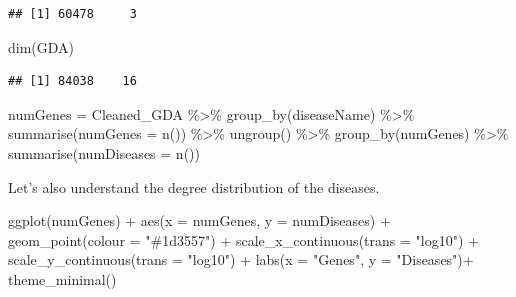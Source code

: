 \documentclass[
]{book}
\newenvironment{Shaded}{\begin{snugshade}}{\end{snugshade}}
\newcommand{\AttributeTok}[1]{\textcolor[rgb]{0.77,0.63,0.00}{#1}}
\newcommand{\FunctionTok}[1]{\textcolor[rgb]{0.00,0.00,0.00}{#1}}
\newcommand{\NormalTok}[1]{#1}
\newcommand{\OtherTok}[1]{\textcolor[rgb]{0.56,0.35,0.01}{#1}}
\newcommand{\SpecialCharTok}[1]{\textcolor[rgb]{0.00,0.00,0.00}{#1}}
\newcommand{\StringTok}[1]{\textcolor[rgb]{0.31,0.60,0.02}{#1}}
\begin{document}
\begin{verbatim}
## [1] 60478     3
\end{verbatim}

\begin{Shaded}
\begin{Highlighting}[]
\FunctionTok{dim}\NormalTok{(GDA)}
\end{Highlighting}
\end{Shaded}

\begin{verbatim}
## [1] 84038    16
\end{verbatim}

\begin{Shaded}
\begin{Highlighting}[]
\NormalTok{numGenes }\OtherTok{=}\NormalTok{ Cleaned\_GDA }\SpecialCharTok{\%\textgreater{}\%} 
  \FunctionTok{group\_by}\NormalTok{(diseaseName) }\SpecialCharTok{\%\textgreater{}\%}
  \FunctionTok{summarise}\NormalTok{(}\AttributeTok{numGenes =} \FunctionTok{n}\NormalTok{()) }\SpecialCharTok{\%\textgreater{}\%}
  \FunctionTok{ungroup}\NormalTok{() }\SpecialCharTok{\%\textgreater{}\%}
  \FunctionTok{group\_by}\NormalTok{(numGenes) }\SpecialCharTok{\%\textgreater{}\%}
  \FunctionTok{summarise}\NormalTok{(}\AttributeTok{numDiseases =} \FunctionTok{n}\NormalTok{())}
\end{Highlighting}
\end{Shaded}

Let's also understand the degree distribution of the diseases.

\begin{Shaded}
\begin{Highlighting}[]
\FunctionTok{ggplot}\NormalTok{(numGenes) }\SpecialCharTok{+}
  \FunctionTok{aes}\NormalTok{(}\AttributeTok{x =}\NormalTok{ numGenes, }\AttributeTok{y =}\NormalTok{ numDiseases) }\SpecialCharTok{+}
  \FunctionTok{geom\_point}\NormalTok{(}\AttributeTok{colour =} \StringTok{"\#1d3557"}\NormalTok{) }\SpecialCharTok{+}
  \FunctionTok{scale\_x\_continuous}\NormalTok{(}\AttributeTok{trans =} \StringTok{"log10"}\NormalTok{) }\SpecialCharTok{+}
  \FunctionTok{scale\_y\_continuous}\NormalTok{(}\AttributeTok{trans =} \StringTok{"log10"}\NormalTok{) }\SpecialCharTok{+}
  \FunctionTok{labs}\NormalTok{(}\AttributeTok{x =} \StringTok{"Genes"}\NormalTok{, }\AttributeTok{y =} \StringTok{"Diseases"}\NormalTok{)}\SpecialCharTok{+}
  \FunctionTok{theme\_minimal}\NormalTok{()}
\end{Highlighting}
\end{Shaded}
\end{document}
